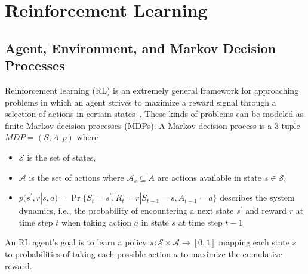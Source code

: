 
\section{Reinforcement Learning}\label{sec:reinforcement-learning}


\subsection{Agent, Environment, and Markov Decision Processes}\label{sec:rl-mdp}

Reinforcement learning (RL) is an extremely general framework for approaching problems
in which an agent strives to maximize a reward signal through a selection of actions
in certain states~\cite{sutton_reinforcement_2020}.
These kinds of problems can be modeled as finite Markov decision processes (MDPs).
A Markov decision process is a 3-tuple $MDP=(S,A,p)$ where

\begin{itemize}
  \item $\mathcal{S}$ is the set of states,
  \item $\mathcal{A}$ is the set of actions where $\mathcal{A}_s\subseteq A$ are actions available in state $s\in\mathcal{S}$,
  \item $p(s^\prime,r|s,a)=\Pr\{S_t=s^\prime, R_t=r|S_{t-1}=s, A_{t-1}=a\}$
  describes the system dynamics, i.e., the probability of encountering a next
  state $s^\prime$ and reward $r$ at time step $t$ when taking action $a$ in
  state $s$ at time step $t-1$
\end{itemize}

An RL agent's goal is to learn a policy $\pi:\mathcal{S}\times\mathcal{A}\rightarrow [0,1]$
mapping each state $s$ to probabilities of taking each possible action $a$ to maximize
the cumulative reward.

